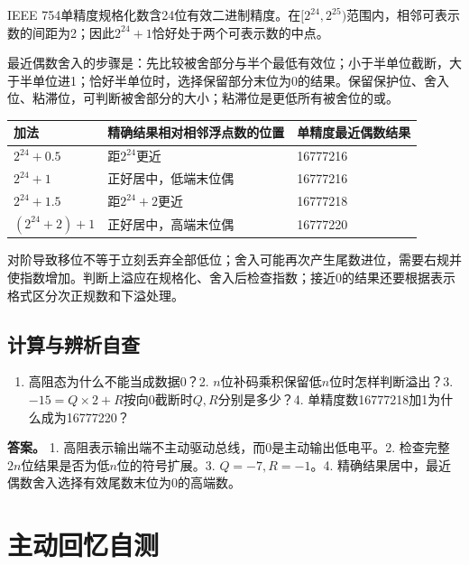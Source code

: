 IEEE 754单精度规格化数含24位有效二进制精度。在\([2^{24},2^{25})\)范围内，相邻可表示数的间距为2；因此\(2^{24}+1\)恰好处于两个可表示数的中点。

最近偶数舍入的步骤是：先比较被舍部分与半个最低有效位；小于半单位截断，大于半单位进1；恰好半单位时，选择保留部分末位为0的结果。保留保护位、舍入位、粘滞位，可判断被舍部分的大小；粘滞位是更低所有被舍位的或。

\par\medskip\noindent\begin{minipage}{\linewidth}\fontsize{9.3}{12}\selectfont\begin{tabularx}{\linewidth}{@{}YYY@{}}
\toprule\noalign{}
加法 & 精确结果相对相邻浮点数的位置 & 单精度最近偶数结果 \\
\midrule\noalign{}


\(2^{24}+0.5\) & 距\(2^{24}\)更近 & 16777216 \\
\(2^{24}+1\) & 正好居中，低端末位偶 & 16777216 \\
\(2^{24}+1.5\) & 距\(2^{24}+2\)更近 & 16777218 \\
\((2^{24}+2)+1\) & 正好居中，高端末位偶 & 16777220 \\
\bottomrule\end{tabularx}
\end{minipage}\par\medskip

对阶导致移位不等于立刻丢弃全部低位；舍入可能再次产生尾数进位，需要右规并使指数增加。判断上溢应在规格化、舍入后检查指数；接近0的结果还要根据表示格式区分次正规数和下溢处理。

\subsection{计算与辨析自查}\label{CO02-extra-check}

\begin{enumerate}
\def\labelenumi{\arabic{enumi}.}
\tightlist
\item
  高阻态为什么不能当成数据0？2. \(n\)位补码乘积保留低\(n\)位时怎样判断溢出？3. \(-15=Q\times2+R\)按向0截断时\(Q,R\)分别是多少？4. 单精度数16777218加1为什么成为16777220？
\end{enumerate}

\textbf{答案。} 1. 高阻表示输出端不主动驱动总线，而0是主动输出低电平。2. 检查完整\(2n\)位结果是否为低\(n\)位的符号扩展。3. \(Q=-7,R=-1\)。4. 精确结果居中，最近偶数舍入选择有效尾数末位为0的高端数。

\section{主动回忆自测}\label{CO02-recall}

